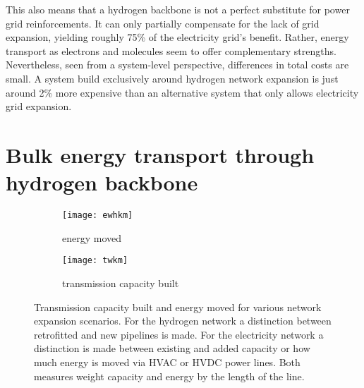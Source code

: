 

This also means that a hydrogen backbone is not a perfect substitute for power
grid reinforcements. It can only partially compensate for the lack of grid
expansion, yielding roughly 75\% of the electricity grid's benefit. Rather, energy
transport as electrons and molecules seem to offer complementary
strengths. Nevertheless, seen from a system-level perspective, differences in
total costs are small. A system build exclusively around hydrogen network
expansion is just around 2\% more expensive than an alternative system that only
allows electricity grid expansion. %


\section*{Bulk energy transport through hydrogen backbone}
\label{sec:energy-moved}

\begin{figure}
    \centering
        \begin{subfigure}[t]{0.49\textwidth}
            \centering
            \caption{energy moved}
            \texttt{[image: ewhkm]}
            \label{fig:network-stats:ewhkm}
        \end{subfigure}
        \begin{subfigure}[t]{0.49\textwidth}
            \centering
            \caption{transmission capacity built}
            \texttt{[image: twkm]}
            \label{fig:network-stats:twkm}
        \end{subfigure}
    \caption{Transmission capacity built and energy moved for various network expansion scenarios.
        For the hydrogen network a distinction between retrofitted and new pipelines is made.
        For the electricity network a distinction is made between existing and added capacity
        or how much energy is moved via HVAC or HVDC power lines. Both measures weight capacity
        and energy by the length of the line.}
    \label{fig:network-stats}
\end{figure}

